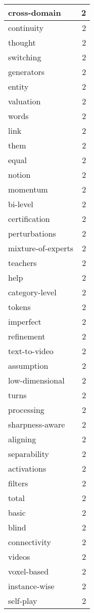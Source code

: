 \begin{table}[h]
\begin{tabular}{|l|r|}
\hline
cross-domain & 2 \\
\hline
continuity & 2 \\
\hline
thought & 2 \\
\hline
switching & 2 \\
\hline
generators & 2 \\
\hline
entity & 2 \\
\hline
valuation & 2 \\
\hline
words & 2 \\
\hline
link & 2 \\
\hline
them & 2 \\
\hline
equal & 2 \\
\hline
notion & 2 \\
\hline
momentum & 2 \\
\hline
bi-level & 2 \\
\hline
certification & 2 \\
\hline
perturbations & 2 \\
\hline
mixture-of-experts & 2 \\
\hline
teachers & 2 \\
\hline
help & 2 \\
\hline
category-level & 2 \\
\hline
tokens & 2 \\
\hline
imperfect & 2 \\
\hline
refinement & 2 \\
\hline
text-to-video & 2 \\
\hline
assumption & 2 \\
\hline
low-dimensional & 2 \\
\hline
turns & 2 \\
\hline
processing & 2 \\
\hline
sharpness-aware & 2 \\
\hline
aligning & 2 \\
\hline
separability & 2 \\
\hline
activations & 2 \\
\hline
filters & 2 \\
\hline
total & 2 \\
\hline
basic & 2 \\
\hline
blind & 2 \\
\hline
connectivity & 2 \\
\hline
videos & 2 \\
\hline
voxel-based & 2 \\
\hline
instance-wise & 2 \\
\hline
self-play & 2 \\

\end{tabular}
\end{table}

